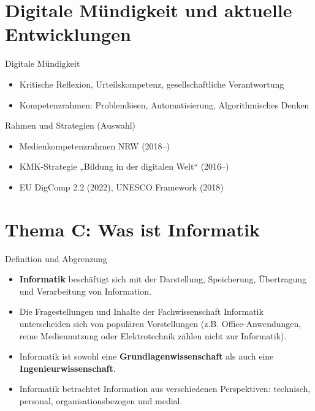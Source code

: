 \documentclass{article}
\begin{document}
\section{Digitale Mündigkeit und aktuelle Entwicklungen}

\begin{block}{Digitale Mündigkeit}
    \begin{itemize}
        \item Kritische Reflexion, Urteilskompetenz, gesellschaftliche Verantwortung
        \item Kompetenzrahmen: Problemlösen, Automatisierung, Algorithmisches Denken
    \end{itemize}
\end{block}

\begin{block}{Rahmen und Strategien (Auswahl)}
    \begin{itemize}
        \item Medienkompetenzrahmen NRW (2018–)
        \item KMK-Strategie „Bildung in der digitalen Welt“ (2016–)
        \item EU DigComp 2.2 (2022), UNESCO Framework (2018)
    \end{itemize}
\end{block}

\section{Thema C: Was ist Informatik}
\begin{block}{Definition und Abgrenzung}
    \begin{itemize}
        \item \textbf{Informatik} beschäftigt sich mit der Darstellung, Speicherung, Übertragung und Verarbeitung von Information.
        \item Die Fragestellungen und Inhalte der Fachwissenschaft Informatik unterscheiden sich von populären Vorstellungen (z.B. Office-Anwendungen, reine Mediennutzung oder Elektrotechnik zählen nicht zur Informatik).
        \item Informatik ist sowohl eine \textbf{Grundlagenwissenschaft} als auch eine \textbf{Ingenieurwissenschaft}.
        \item Informatik betrachtet Information aus verschiedenen Perspektiven: technisch, personal, organisationsbezogen und medial.
    \end{itemize}
\end{block}
\end{document}
